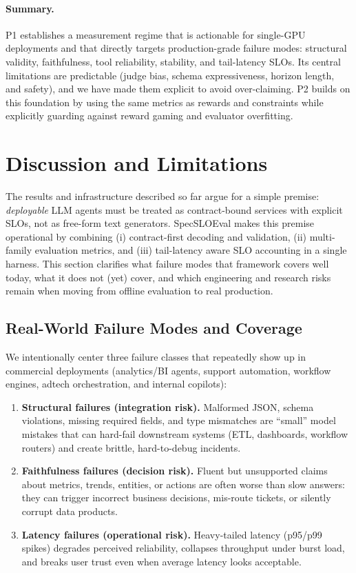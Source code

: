 \documentclass[11pt]{article}
\begin{document}
\paragraph{Summary.}
P1 establishes a measurement regime that is actionable for single-GPU deployments and that directly targets production-grade failure modes: structural validity, faithfulness, tool reliability, stability, and tail-latency SLOs.
Its central limitations are predictable (judge bias, schema expressiveness, horizon length, and safety), and we have made them explicit to avoid over-claiming.
P2 builds on this foundation by using the same metrics as rewards and constraints while explicitly guarding against reward gaming and evaluator overfitting.


\section{Discussion and Limitations}
\label{sec:discussion}

The results and infrastructure described so far argue for a simple premise:
\emph{deployable} LLM agents must be treated as contract-bound services with explicit SLOs, not as free-form text generators.
SpecSLOEval makes this premise operational by combining (i) contract-first decoding and validation, (ii) multi-family evaluation metrics, and (iii) tail-latency aware SLO accounting in a single harness.
This section clarifies what failure modes that framework covers well today, what it does not (yet) cover, and which engineering and research risks remain when moving from offline evaluation to real production.

\subsection{Real-World Failure Modes and Coverage}

We intentionally center three failure classes that repeatedly show up in commercial deployments (analytics/BI agents, support automation, workflow engines, adtech orchestration, and internal copilots):

\begin{enumerate}[leftmargin=12pt]
    \item \textbf{Structural failures (integration risk).}
    Malformed JSON, schema violations, missing required fields, and type mismatches are ``small'' model mistakes that can hard-fail downstream systems (ETL, dashboards, workflow routers) and create brittle, hard-to-debug incidents.

    \item \textbf{Faithfulness failures (decision risk).}
    Fluent but unsupported claims about metrics, trends, entities, or actions are often worse than slow answers: they can trigger incorrect business decisions, mis-route tickets, or silently corrupt data products.

    \item \textbf{Latency failures (operational risk).}
    Heavy-tailed latency (p95/p99 spikes) degrades perceived reliability, collapses throughput under burst load, and breaks user trust even when average latency looks acceptable.
\end{enumerate}
\end{document}
